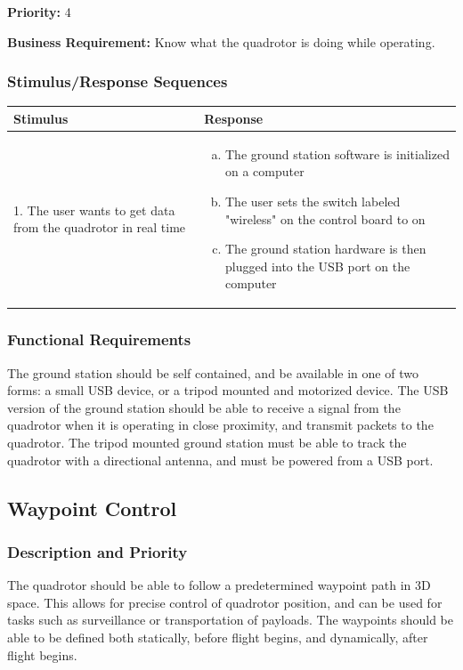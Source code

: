 \documentclass[english]{article}
\numberwithin{equation}{section} %
\begin{document}
\textbf{Priority:} 4

\textbf{Business Requirement:} Know what the quadrotor is doing while operating.

\subsubsection{Stimulus/Response Sequences}

\begin{tabular}{p{3cm} | p{8.5cm}}
\hline
\textbf{Stimulus} & \textbf{Response}\\
\hline
1. The user wants to get data from the quadrotor in real time &
\begin{enumerate}[(a)]\itemsep1pt %
\item The ground station software is initialized on a computer
\item The user sets the switch labeled "wireless" on the control board to on
\item The ground station hardware is then plugged into the USB port on the computer
\end{enumerate}
\\ 
\hline
\end{tabular}
\subsubsection{Functional Requirements}
The ground station should be self contained, and be available in one of two forms: a small USB device, or a tripod mounted and motorized device. The USB version of the ground station should be able to receive a signal from the quadrotor when it is operating in close proximity, and transmit packets to the quadrotor. The tripod mounted ground station must be able to track the quadrotor with a directional antenna, and must be powered from a USB port.

\bigskip
\subsection{Waypoint Control}
\subsubsection{Description and Priority}
The quadrotor should be able to follow a predetermined waypoint path in 3D space. This allows for precise control of quadrotor position, and can be used for tasks such as surveillance or transportation of payloads. The waypoints should be able to be defined both statically, before flight begins, and dynamically, after flight begins.
\end{document}
